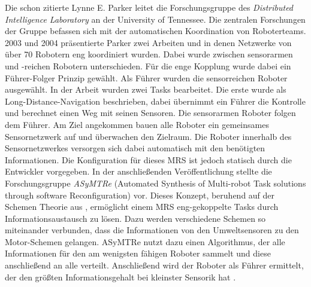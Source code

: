 
Die schon zitierte Lynne E. Parker leitet die Forschungsgruppe des \textit{Distributed Intelligence Laboratory} an der University of Tennessee. Die zentralen Forschungen der Gruppe befassen sich mit der automatischen Koordination von Roboterteams. 2003 und 2004 präsentierte Parker zwei Arbeiten \cite{parker2003effect} und \cite{parker2004tightly} in denen Netzwerke von über 70 Robotern eng koordiniert wurden. Dabei wurde zwischen sensorarmen und -reichen Robotern unterschieden. Für die enge Kopplung wurde dabei ein Führer-Folger Prinzip gewählt. Als Führer wurden die sensorreichen Roboter ausgewählt. In der Arbeit wurden zwei Tasks bearbeitet. Die erste wurde als Long-Distance-Navigation beschrieben, dabei übernimmt ein Führer die Kontrolle und berechnet einen Weg mit seinen Sensoren. Die sensorarmen Roboter folgen dem Führer. Am Ziel angekommen bauen alle Roboter ein gemeinsames Sensornetzwerk auf und überwachen den Zielraum. Die Roboter innerhalb des Sensornetzwerkes versorgen sich dabei automatisch mit den benötigten Informationen. Die Konfiguration für dieses MRS ist jedoch statisch durch die Entwickler vorgegeben. In der anschließenden Veröffentlichung \cite{parker2005enabling} stellte die Forschungsgruppe \textit{ASyMTRe} (Automated Synthesis of Multi-robot Task solutions through software Reconfiguration) vor. Dieses Konzept, beruhend auf der Schemen Theorie aus \cite{arkin1987motor}, ermöglicht einem MRS eng-gekoppelte Tasks durch Informationsaustausch zu lösen. Dazu werden verschiedene Schemen so miteinander verbunden, dass die Informationen von den Umweltsensoren zu den Motor-Schemen gelangen. ASyMTRe nutzt dazu einen Algorithmus, der alle Informationen für den am wenigsten fähigen Roboter sammelt und diese anschließend an alle verteilt. Anschließend wird der Roboter als Führer ermittelt, der den größten Informationsgehalt bei kleinster Sensorik hat \citep{lundh2006plan} .

